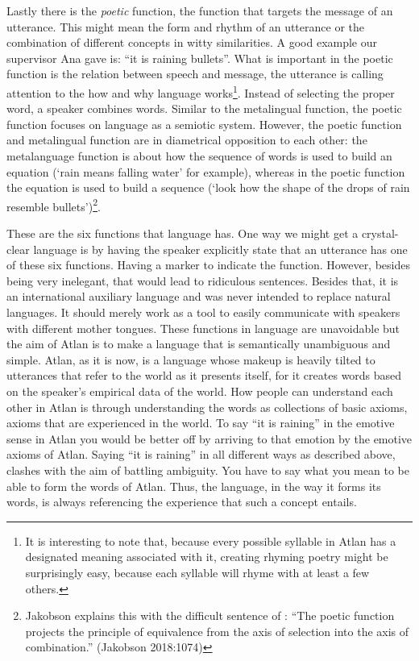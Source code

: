 Lastly there is the \textit{poetic} function, the function that targets the message of an utterance. This might mean the form and rhythm of an utterance or the combination of different concepts in witty similarities. A good example our supervisor Ana gave is: “it is raining bullets”. What is important in the poetic function is the relation between speech and message, the utterance is calling attention to the how and why language works\footnote{It is interesting to note that, because every possible syllable in Atlan has a designated meaning associated with it, creating rhyming poetry might be surprisingly easy, because each syllable will rhyme with at least a few others.}. Instead of selecting the proper word, a speaker combines words. Similar to the metalingual function, the poetic function focuses on language as a semiotic system. However, the poetic function and metalingual function are in diametrical opposition to each other: the metalanguage function is about how the sequence of words is used to build an equation (‘rain means falling water’ for example), whereas in the poetic function the equation is used to build a sequence (‘look how the shape of the drops of rain resemble bullets’)\footnote{Jakobson explains this with the difficult sentence of : “The poetic function projects the principle of equivalence from the axis of selection into the axis of combination.” (Jakobson 2018:1074)}.


These are the six functions that language has. One way we might get a crystal-clear language is by having the speaker explicitly state that an utterance has one of these six functions. Having a marker to indicate the function. However, besides being very inelegant, that would lead to ridiculous sentences. Besides that, it is an international auxiliary language and was never intended to replace natural languages. It should merely work as a tool to easily communicate with speakers with different mother tongues. These functions in language are unavoidable but the aim of Atlan is to make a language that is semantically unambiguous and simple. Atlan, as it is now, is a language whose makeup is heavily tilted to utterances that refer to the world as it presents itself, for it creates words based on the speaker's empirical data of the world. How people can understand each other in Atlan is through understanding the words as collections of basic axioms, axioms that are experienced in the world. To say “it is raining” in the emotive sense in Atlan you would be better off by arriving to that emotion by the emotive axioms of Atlan. Saying “it is raining” in all  different ways as described above, clashes with the aim of battling ambiguity. You have to say what you mean to be able to form the words of Atlan. Thus, the language, in the way it forms its words, is always referencing the experience that such a concept entails.   

